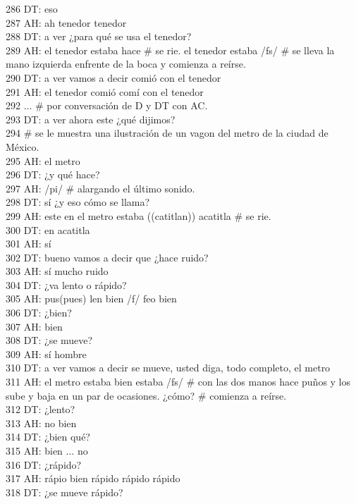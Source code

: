 286 DT: eso\\
287 AH: ah tenedor tenedor \\
288 DT: a ver ¿para qué se usa el tenedor?\\
289 AH: el tenedor estaba hace \# se rie. el tenedor estaba /fs/ \# se lleva la mano izquierda enfrente de la boca y comienza a reírse.\\
290 DT: a ver vamos a decir comió con el tenedor\\
291 AH: el tenedor comió comí con el tenedor\\
292 ... \# por conversación de D y DT con AC.\\
293 DT: a ver ahora este ¿qué dijimos?\\
294 \# se le muestra una ilustración de un vagon del metro de la ciudad de México.\\
295 AH: el metro\\
296 DT: ¿y qué hace?\\
297 AH: /pi/ \# alargando el último sonido.\\
298 DT: sí ¿y eso cómo se llama?\\
299 AH: este en el metro estaba ((catitlan)) acatitla \# se rie.\\
300 DT: en acatitla\\
301 AH: sí\\
302 DT: bueno vamos a decir que ¿hace ruido?\\
303 AH: sí mucho ruido\\
304 DT: ¿va lento o rápido?\\
305 AH: pus(pues) len bien /f/ feo bien \\
306 DT: ¿bien?\\
307 AH: bien\\
308 DT: ¿se mueve?\\
309 AH: sí hombre\\
310 DT: a ver vamos a decir se mueve, usted diga, todo completo, el metro\\
311 AH: el metro estaba bien estaba /fs/ \# con las dos manos hace puños y los sube y baja en un par de ocasiones. ¿cómo? \# comienza a reírse.\\
312 DT: ¿lento?\\
313 AH: no bien\\
314 DT: ¿bien qué?\\
315 AH: bien ... no\\
316 DT: ¿rápido?\\
317 AH: rápio bien rápido rápido rápido\\
318 DT: ¿se mueve rápido?\\
